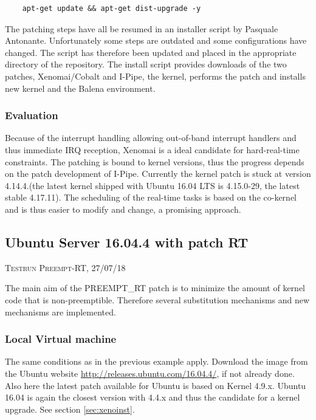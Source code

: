 \documentclass[]{scrartcl}
\begin{document}
\begin{verbatim}
	apt-get update && apt-get dist-upgrade -y
\end{verbatim}

The patching steps have all be resumed in an installer script by Pasquale Antonante. Unfortunately some steps are outdated and some configurations have changed. The script has therefore been updated and placed in the appropriate directory of the repository. The install script provides downloads of the two patches, Xenomai/Cobalt and I-Pipe, the kernel, performs the patch and installs new kernel and the Balena environment.

\subsubsection{Evaluation}

Because of the interrupt handling allowing out-of-band interrupt handlers and thus immediate IRQ reception, Xenomai is a ideal candidate for hard-real-time constraints. The patching is bound to kernel versions, thus the progress depends on the patch development of I-Pipe. Currently the kernel patch is stuck at version 4.14.4.(the latest kernel shipped with Ubuntu 16.04 LTS is 4.15.0-29, the latest stable 4.17.11). The scheduling of the real-time tasks is based on the co-kernel and is thus easier to modify and change, a promising approach.

\subsection{Ubuntu Server 16.04.4 with patch RT}

{\small\textsc{Testrun Preempt-RT, 27/07/18} \bigskip}

The main aim of the PREEMPT\_RT patch is to minimize the amount of kernel code that is non-preemptible. Therefore several substitution mechanisms and new mechanisms are implemented.

\subsubsection{Local Virtual machine}

The same conditions as in the previous example apply. Download the image from the Ubuntu website \url{http://releases.ubuntu.com/16.04.4/}, if not already done. Also here the latest patch available for Ubuntu is based on Kernel 4.9.x. Ubuntu 16.04 is again the closest version with 4.4.x and thus the candidate for a kernel upgrade. See section \ref{sec:xenoinst}.
\end{document}
